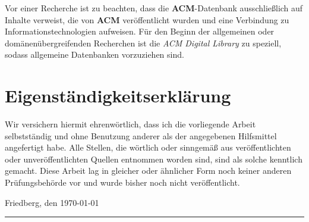 \documentclass[
	ngerman,
	parskip=half,
	headsepline,
	fontsize=12pt,
	DIV=13,
	listof=leveldown,
	]{scrreprt}
\begin{document}
	Vor einer Recherche ist zu beachten, dass die \textbf{ACM}-Datenbank ausschließlich auf Inhalte verweist, die von \textbf{ACM} veröffentlicht wurden und  eine Verbindung zu Informationstechnologien aufweisen. Für den Beginn der allgemeinen oder domänenübergreifenden Recherchen ist die \textsl{ACM Digital Library} zu speziell, sodass allgemeine Datenbanken vorzuziehen sind.
	
	\chapter{Eigenständigkeitserklärung}
	
	Wir versichern hiermit ehrenwörtlich, dass ich die vorliegende Arbeit selbstständig und ohne Benutzung anderer als der angegebenen Hilfsmittel angefertigt habe. Alle Stellen, die wörtlich oder sinngemäß aus veröffentlichten oder unveröffentlichten Quellen entnommen worden sind, sind als solche kenntlich gemacht. Diese Arbeit lag in gleicher oder ähnlicher Form noch keiner anderen Prüfungsbehörde vor und wurde bisher noch nicht veröffentlicht.
	
	Friedberg, den \today
	
	
	\rule[-0.2cm]{5cm}{0.5pt}
	
	\textsc{\theauthor} 

	
	
	
	\printbibliography
\end{document}
